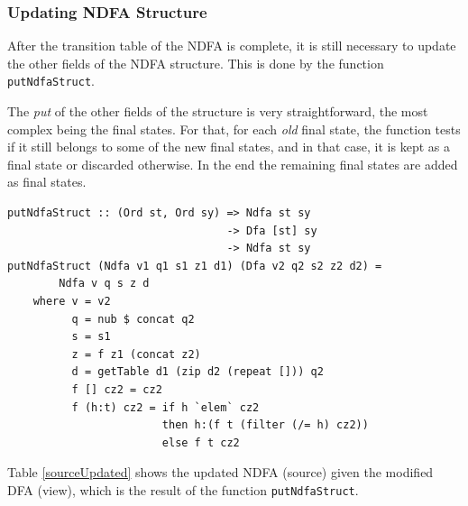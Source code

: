 \subsubsection{Updating NDFA Structure}
After the  transition table of the NDFA is complete, it is still necessary to update the other fields of the NDFA structure. This is done by the function \texttt{putNdfaStruct}.

The \textit{put} of the other fields of the structure is very straightforward, the most complex being the final states. For that, for each \emph{old} final state, the function tests if it still belongs to some of the new final states, and in that case, it is kept as a final state or discarded otherwise. In the end the remaining final states are added as final states. 

\begin{verbatim}
putNdfaStruct :: (Ord st, Ord sy) => Ndfa st sy  
                                  -> Dfa [st] sy 
                                  -> Ndfa st sy
putNdfaStruct (Ndfa v1 q1 s1 z1 d1) (Dfa v2 q2 s2 z2 d2) = 
        Ndfa v q s z d
    where v = v2
          q = nub $ concat q2
          s = s1
          z = f z1 (concat z2)
          d = getTable d1 (zip d2 (repeat [])) q2
          f [] cz2 = cz2
          f (h:t) cz2 = if h `elem` cz2 
                        then h:(f t (filter (/= h) cz2))
                        else f t cz2
\end{verbatim}

\vspace{5mm}
Table \ref{sourceUpdated} shows the updated NDFA (source) given the modified DFA (view), which is the result of the function \texttt{putNdfaStruct}.

